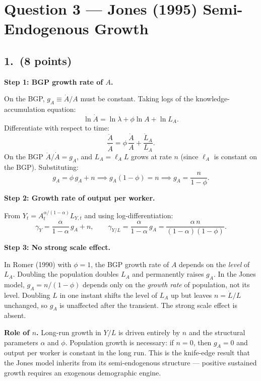 \documentclass[a4paper,11pt]{article}
\begin{document}
\clearpage

\section{Question 3 --- Jones (1995) Semi-Endogenous Growth}

\subsection*{1.\ (8 points)}

\begin{answerbox}
\textbf{Step 1: BGP growth rate of $A$.}

On the BGP, $g_A \equiv \dot{A}/A$ must be constant.  Taking logs of the knowledge-accumulation equation:
\[
    \ln\dot{A} = \ln\lambda + \phi\ln A + \ln L_{A}.
\]
Differentiate with respect to time:
\[
    \frac{\ddot{A}}{\dot{A}} = \phi\,\frac{\dot{A}}{A} + \frac{\dot{L}_A}{L_A}.
\]
On the BGP $\ddot{A}/\dot{A} = g_A$, and $L_A = \ell_A L$ grows at rate $n$ (since $\ell_A$ is constant on the BGP).  Substituting:
\[
    g_A = \phi\,g_A + n \implies g_A(1-\phi) = n \implies \boxed{g_A = \frac{n}{1-\phi}.}
\]

\textbf{Step 2: Growth rate of output per worker.}

From $Y_t = A_t^{\alpha/(1-\alpha)} L_{Y,t}$ and using log-differentiation:
\[
    \gamma_Y = \frac{\alpha}{1-\alpha}\,g_A + n, \qquad
    \gamma_{Y/L} = \frac{\alpha}{1-\alpha}\,g_A = \frac{\alpha\,n}{(1-\alpha)(1-\phi)}.
\]

\textbf{Step 3: No strong scale effect.}

In Romer (1990) with $\phi = 1$, the BGP growth rate of $A$ depends on the \emph{level} of $L_A$.  Doubling the population doubles $L_A$ and permanently raises $g_A$.  In the Jones model, $g_A = n/(1-\phi)$ depends only on the \emph{growth rate} of population, not its level.  Doubling $L$ in one instant shifts the level of $L_A$ up but leaves $n = \dot{L}/L$ unchanged, so $g_A$ is unaffected after the transient.  The strong scale effect is absent.

\textbf{Role of $n$.}  Long-run growth in $Y/L$ is driven entirely by $n$ and the structural parameters $\alpha$ and $\phi$.  Population growth is necessary: if $n = 0$, then $g_A = 0$ and output per worker is constant in the long run.  This is the knife-edge result that the Jones model inherits from its semi-endogenous structure --- positive sustained growth requires an exogenous demographic engine.
\end{answerbox}
\end{document}
